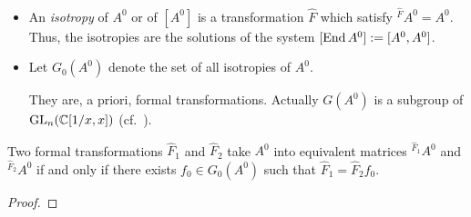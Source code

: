 \begin{defn}
  \begin{itemize}
    \item An \emph{isotropy} of $A^0$ or of $[A^0]$ is a transformation $\hat
      F$ which satisfy ${}^{\hat F}\!A^0=A^0$.
      Thus, the isotropies are the solutions of the system
      $[\operatorname{End} A^0]:=[A^0,A^0]$.
    \item Let $G_0(A^0)$ denote the set of all isotropies of $A^0$.
      \begin{s-rem}
        They are, a priori, formal transformations. Actually $G(A^0)$ is a
        subgroup of $\operatorname{GL}_n(\mathbb{C}[1/x,x])$
        (cf.~\cite[853]{Loday1994}).
      \end{s-rem}
  \end{itemize}
\end{defn}
\begin{lem}
  Two formal transformations $\hat F_1$ and $\hat F_2$ take $A^0$ into
  equivalent matrices ${}^{\hat F_1}\!A^0$ and  ${}^{\hat F_2}\!A^0$ if and
  only if there exists $f_0\in G_0(A^0)$ such that $\hat F_1=\hat F_2f_0$.
\end{lem}
\begin{proof}
  \TODO{}
\end{proof}

